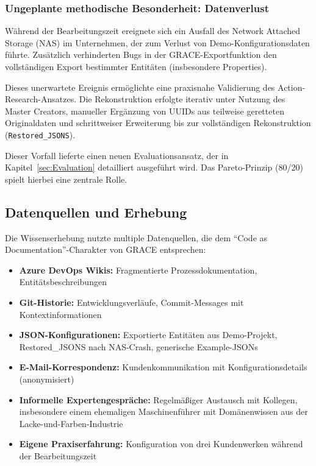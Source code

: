\subsubsection{Ungeplante methodische Besonderheit: Datenverlust}
\label{subsubsec:NASCrashValidierung}

Während der Bearbeitungszeit ereignete sich ein Ausfall des Network Attached Storage (NAS) im Unternehmen, der zum Verlust von Demo-Konfigurationsdaten führte. Zusätzlich verhinderten Bugs in der GRACE-Exportfunktion den vollständigen Export bestimmter Entitäten (insbesondere Properties).

Dieses unerwartete Ereignis ermöglichte eine praxisnahe Validierung des Action-Research-Ansatzes. Die Rekonstruktion erfolgte iterativ unter Nutzung des Master Creators, manueller Ergänzung von UUIDs aus teilweise geretteten Originaldaten und schrittweiser Erweiterung bis zur vollständigen Rekonstruktion (\texttt{Restored\_JSONS}).

Dieser Vorfall lieferte einen neuen Evaluationsansatz, der in Kapitel~\ref{sec:Evaluation} detailliert ausgeführt wird. Das Pareto-Prinzip (80/20) spielt hierbei eine zentrale Rolle.


\subsection{Datenquellen und Erhebung}
\label{subsec:Datenquellen}

Die Wissenserhebung nutzte multiple Datenquellen, die dem ``Code as Documentation''-Charakter von GRACE entsprechen:

\begin{itemize}
    \item \textbf{Azure DevOps Wikis:} Fragmentierte Prozessdokumentation, Entitätsbeschreibungen
    \item \textbf{Git-Historie:} Entwicklungsverläufe, Commit-Messages mit Kontextinformationen
    \item \textbf{JSON-Konfigurationen:} Exportierte Entitäten aus Demo-Projekt, Restored\_JSONS nach NAS-Crash, generische Example-JSONs
    \item \textbf{E-Mail-Korrespondenz:} Kundenkommunikation mit Konfigurationsdetails (anonymisiert)
    \item \textbf{Informelle Expertengespräche:} Regelmäßiger Austausch mit Kollegen, insbesondere einem ehemaligen Maschinenführer mit Domänenwissen aus der Lacke-und-Farben-Industrie
    \item \textbf{Eigene Praxiserfahrung:} Konfiguration von drei Kundenwerken während der Bearbeitungszeit
\end{itemize}

